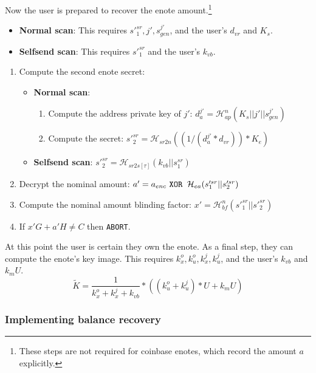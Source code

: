 Now the user is prepared to recover the enote amount.\footnote{These steps are not required for coinbase enotes, which record the amount $a$ explicitly.}
\begin{itemize}
    \item \textbf{Normal scan}: This requires $s'^{sr}_1, j', s^{j'}_{gen}$, and the user's $d_{vr}$ and $K_s$.

    \item \textbf{Selfsend scan}: This requires $s'^{sr}_1$ and the user's $k_{vb}$.
\end{itemize}

\begin{enumerate}
    \item Compute the second enote secret:
        \begin{itemize}
        \item \textbf{Normal scan}:
            \begin{enumerate}
                \item Compute the address private key of $j'$: $d^{j'}_a = \mathcal{H}^n_{ap}(K_s || j' || s^{j'}_{gen})$
                \item Compute the secret: $s'^{sr}_2 = \mathcal{H}_{sr2n}((1/(d^{j'}_a * d_{vr})) * K_e)$
            \end{enumerate}
        \item \textbf{Selfsend scan}: $s'^{sr}_2 = \mathcal{H}_{sr2s[\tau]}(k_{vb} || s^{sr}_1)$
    \end{itemize}

    \item Decrypt the nominal amount: $a' = a_{enc} \textrm{ \tt  XOR } \mathcal{H}_{ea}(s'^{sr}_1 || s'^{sr}_2)$

    \item Compute the nominal amount blinding factor: $x' = \mathcal{H}^n_{bf}(s'^{sr}_1 || s'^{sr}_2)$

    \item If $x' G + a' H \neq C$ then {\tt ABORT}.
\end{enumerate}

At this point the user is certain they own the enote. As a final step, they can compute the enote's key image. This requires $k^o_x, k^o_u, k^j_x, k^j_u$, and the user's $k_{vb}$ and $k_m U$.\vspace{.115cm}
\[ \tilde{K} = \frac{1}{k^o_x + k^j_x + k_{vb}} *((k^o_u + k^j_u)*U + k_m U) \]

\subsubsection{Implementing balance recovery}
\label{subsubsec:jamtis-balance-recovery-implementing}

